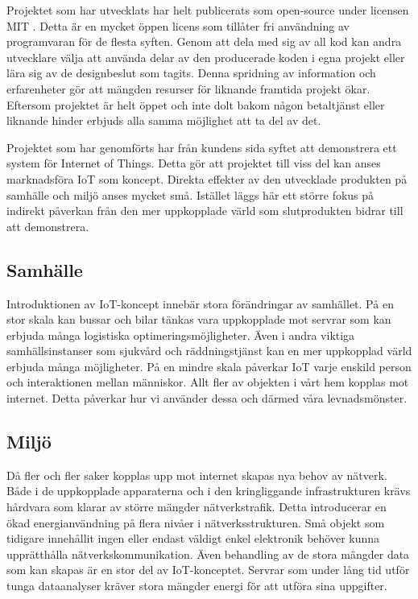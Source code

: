 Projektet som har utvecklats har helt publicerats som open-source under licensen MIT \cite{MIT-license}. Detta är en mycket öppen licens som tillåter fri användning av programvaran för de flesta syften. Genom att dela med sig av all kod kan andra utvecklare välja att använda delar av den producerade koden i egna projekt eller lära sig av de designbeslut som tagits. Denna spridning av information och erfarenheter gör att mängden resurser för liknande framtida projekt ökar. Eftersom projektet är helt öppet och inte dolt bakom någon betaltjänst eller liknande hinder erbjuds alla samma möjlighet att ta del av det.

Projektet som har genomförts har från kundens sida syftet att demonstrera ett system för Internet of Things. Detta gör att projektet till viss del kan anses marknadsföra IoT som koncept. Direkta effekter av den utvecklade produkten på samhälle och miljö anses mycket små. Istället läggs här ett större fokus på indirekt påverkan från den mer uppkopplade värld som slutprodukten bidrar till att demonstrera.

\subsection{Samhälle}
Introduktionen av IoT-koncept innebär stora förändringar av samhället. På en stor skala kan bussar och bilar tänkas vara uppkopplade mot servrar som kan erbjuda många logistiska optimeringsmöjligheter. Även i andra viktiga samhällsinstanser som sjukvård och räddningstjänst kan en mer uppkopplad värld erbjuda många möjligheter. På en mindre skala påverkar IoT varje enskild person och interaktionen mellan människor. Allt fler av objekten i vårt hem kopplas mot internet. Detta påverkar hur vi använder dessa och därmed våra levnadsmönster.

\subsection{Miljö}
Då fler och fler saker kopplas upp mot internet skapas nya behov av nätverk. Både i de uppkopplade apparaterna och i den kringliggande infrastrukturen krävs hårdvara som klarar av större mängder nätverkstrafik. Detta introducerar en ökad energianvändning på flera nivåer i nätverksstrukturen. Små objekt som tidigare innehållit ingen eller endast väldigt enkel elektronik behöver kunna upprätthålla nätverkskommunikation. Även behandling av de stora mängder data som kan skapas är en stor del av IoT-konceptet. Servrar som under lång tid utför tunga dataanalyser kräver stora mängder energi för att utföra sina uppgifter.

